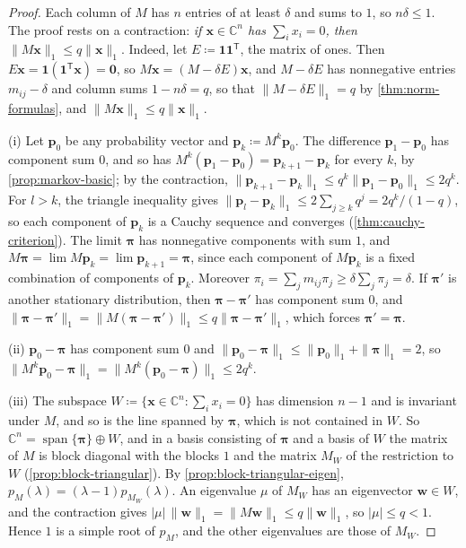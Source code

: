 \begin{proof}
Each column of $M$ has $n$ entries of at least $\delta$ and sums to $1$, so $n\delta\le1$. The proof rests on a contraction: \emph{if $\mathbf x\in\mathbb C^n$ has $\sum_ix_i=0$, then $\|M\mathbf x\|_1\le q\|\mathbf x\|_1$}. Indeed, let $E\coloneqq\mathbf 1\mathbf 1^{\mathsf T}$, the matrix of ones. Then $E\mathbf x=\mathbf 1(\mathbf 1^{\mathsf T}\mathbf x)=\mathbf 0$, so $M\mathbf x=(M-\delta E)\mathbf x$, and $M-\delta E$ has nonnegative entries $m_{ij}-\delta$ and column sums $1-n\delta=q$, so that $\|M-\delta E\|_1=q$ by \cref{thm:norm-formulas}, and $\|M\mathbf x\|_1\le q\|\mathbf x\|_1$.

(i) Let $\mathbf p_0$ be any probability vector and $\mathbf p_k\coloneqq M^k\mathbf p_0$. The difference $\mathbf p_1-\mathbf p_0$ has component sum $0$, and so has $M^k(\mathbf p_1-\mathbf p_0)=\mathbf p_{k+1}-\mathbf p_k$ for every $k$, by \cref{prop:markov-basic}; by the contraction, $\|\mathbf p_{k+1}-\mathbf p_k\|_1\le q^k\|\mathbf p_1-\mathbf p_0\|_1\le2q^k$. For $l>k$, the triangle inequality gives $\|\mathbf p_l-\mathbf p_k\|_1\le2\sum_{j\ge k}q^j=2q^k/(1-q)$, so each component of $\mathbf p_k$ is a Cauchy sequence and converges (\cref{thm:cauchy-criterion}). The limit $\boldsymbol\pi$ has nonnegative components with sum $1$, and $M\boldsymbol\pi=\lim M\mathbf p_k=\lim\mathbf p_{k+1}=\boldsymbol\pi$, since each component of $M\mathbf p_k$ is a fixed combination of components of $\mathbf p_k$. Moreover $\pi_i=\sum_jm_{ij}\pi_j\ge\delta\sum_j\pi_j=\delta$. If $\boldsymbol\pi'$ is another stationary distribution, then $\boldsymbol\pi-\boldsymbol\pi'$ has component sum $0$, and $\|\boldsymbol\pi-\boldsymbol\pi'\|_1=\|M(\boldsymbol\pi-\boldsymbol\pi')\|_1\le q\|\boldsymbol\pi-\boldsymbol\pi'\|_1$, which forces $\boldsymbol\pi'=\boldsymbol\pi$.

(ii) $\mathbf p_0-\boldsymbol\pi$ has component sum $0$ and $\|\mathbf p_0-\boldsymbol\pi\|_1\le\|\mathbf p_0\|_1+\|\boldsymbol\pi\|_1=2$, so $\|M^k\mathbf p_0-\boldsymbol\pi\|_1=\|M^k(\mathbf p_0-\boldsymbol\pi)\|_1\le2q^k$.

(iii) The subspace $W\coloneqq\{\mathbf x\in\mathbb C^n:\sum_ix_i=0\}$ has dimension $n-1$ and is invariant under $M$, and so is the line spanned by $\boldsymbol\pi$, which is not contained in $W$. So $\mathbb C^n=\operatorname{span}\{\boldsymbol\pi\}\oplus W$, and in a basis consisting of $\boldsymbol\pi$ and a basis of $W$ the matrix of $M$ is block diagonal with the blocks $1$ and the matrix $M_W$ of the restriction to $W$ (\cref{prop:block-triangular}). By \cref{prop:block-triangular-eigen}, $p_M(\lambda)=(\lambda-1)p_{M_W}(\lambda)$. An eigenvalue $\mu$ of $M_W$ has an eigenvector $\mathbf w\in W$, and the contraction gives $|\mu|\,\|\mathbf w\|_1=\|M\mathbf w\|_1\le q\|\mathbf w\|_1$, so $|\mu|\le q<1$. Hence $1$ is a simple root of $p_M$, and the other eigenvalues are those of $M_W$.
\end{proof}

